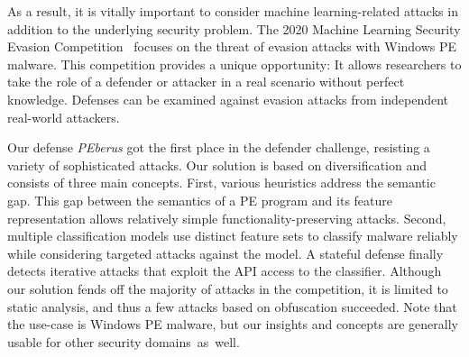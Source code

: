 \documentclass[conference]{IEEEtran}
\newcommand{\defnameit}{\textit{PEberus}\xspace}
\begin{document}
As a result, it is vitally important to consider machine
learning-related attacks in addition to the underlying security
problem. The 2020 Machine Learning Security Evasion 
Competition~\citep{web:Contest} focuses
on the threat of evasion attacks with Windows PE malware. This
competition provides a unique opportunity: It allows researchers to 
take the role of a defender or attacker in a real scenario without 
perfect knowledge. Defenses can be examined against evasion attacks 
from independent real-world attackers.

Our defense \defnameit got the first place in the defender challenge, 
resisting a variety of sophisticated attacks. Our solution is based on 
diversification and consists of three main concepts.
First, various heuristics address the semantic gap. This gap between 
the semantics of a PE program and its feature representation 
allows relatively simple functionality-preserving attacks.
Second, multiple classification models use distinct feature sets to
classify malware reliably while considering targeted attacks against
the model. A stateful defense finally detects iterative attacks that
exploit the API access to the classifier.
Although our solution fends off the majority of attacks in the
competition, it is limited to static analysis, and thus a few attacks
based on obfuscation succeeded. Note that the use-case is Windows
PE malware, but our insights and concepts are generally usable
for other security domains~as~well.
\end{document}
